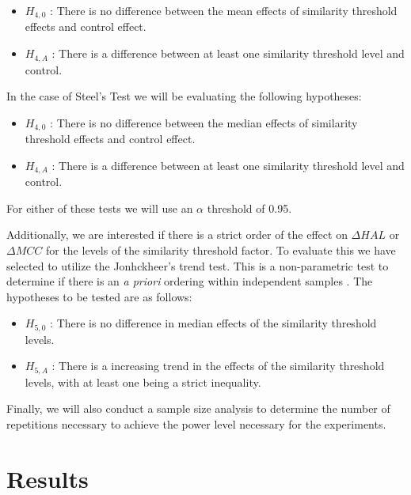 \documentclass[conference]{IEEEtran}
\providecommand{\tightlist}{%
  \setlength{\itemsep}{0pt}\setlength{\parskip}{0pt}}
\begin{document}
\begin{itemize}
\tightlist
\item
  \(H_{4,0}\) : There is no difference between the mean effects of
  similarity threshold effects and control effect.
\item
  \(H_{4,A}\) : There is a difference between at least one similarity
  threshold level and control.
\end{itemize}

\noindent In the case of Steel's Test we will be evaluating the
following hypotheses:

\begin{itemize}
\tightlist
\item
  \(H_{4,0}\) : There is no difference between the median effects of
  similarity threshold effects and control effect.
\item
  \(H_{4,A}\) : There is a difference between at least one similarity
  threshold level and control.
\end{itemize}

\noindent For either of these tests we will use an \(\alpha\) threshold
of 0.95.

Additionally, we are interested if there is a strict order of the effect
on \(\Delta HAL\) or \(\Delta MCC\) for the levels of the similarity
threshold factor. To evaluate this we have selected to utilize the
Jonhckheer's trend test. This is a non-parametric test to determine if
there is an \emph{a priori} ordering within independent samples
\cite{jonckheereDistributionFreeKSampleTest1954}. The hypotheses to be
tested are as follows:

\begin{itemize}
\tightlist
\item
  \(H_{5,0}\) : There is no difference in median effects of the
  similarity threshold levels.
\item
  \(H_{5,A}\) : There is a increasing trend in the effects of the
  similarity threshold levels, with at least one being a strict
  inequality.
\end{itemize}

Finally, we will also conduct a sample size analysis to determine the
number of repetitions necessary to achieve the power level necessary for
the experiments.

\hypertarget{sec:results}{%
\section{Results}\label{sec:results}}
\end{document}
